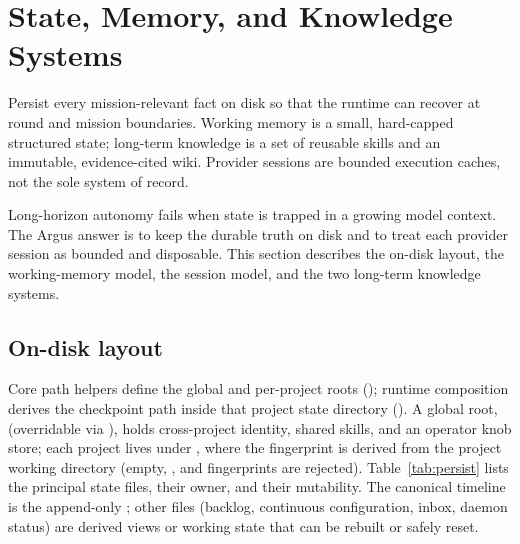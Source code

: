 \section{State, Memory, and Knowledge Systems}
\label{sec:state}

\begin{designbox}
Persist every mission-relevant fact on disk so that the runtime can recover at
round and mission boundaries. Working memory is a small, hard-capped structured state;
long-term knowledge is a set of reusable skills and an immutable, evidence-cited
wiki. Provider sessions are bounded execution caches, not the sole system of record.
\end{designbox}

Long-horizon autonomy fails when state is trapped in a growing model context. The
Argus answer is to keep the durable truth on disk and to treat each provider
session as bounded and disposable. This section describes the on-disk layout, the working-memory
model, the session model, and the two long-term knowledge systems.

\subsection{On-disk layout}

Core path helpers define the global and per-project roots
(); runtime composition derives the checkpoint path inside
that project state directory (). A global root,
(overridable via ), holds cross-project identity, shared
skills, and an operator knob store; each project lives under
, where the fingerprint is derived from the project
working directory (empty, , and \code{/} fingerprints are rejected).
Table~\ref{tab:persist} lists the principal state files, their owner, and their
mutability. The canonical timeline is the append-only ; other
files (backlog, continuous configuration, inbox, daemon status) are derived views
or working state that can be rebuilt or safely reset.

